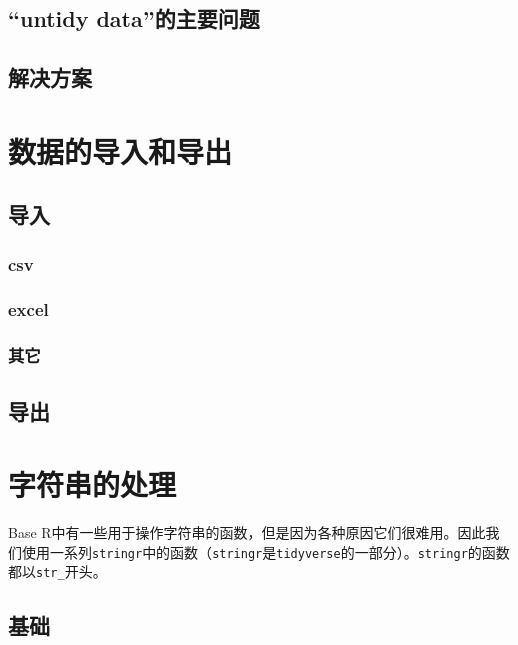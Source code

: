 \documentclass[]{book}
\begin{document}
\hypertarget{untidy-data}{%
\subsection{``untidy data''的主要问题}\label{untidy-data}}

\subsection{解决方案}

\hypertarget{import-export}{%
\section{数据的导入和导出}\label{import-export}}

\hypertarget{data-import}{%
\subsection{导入}\label{data-import}}

\hypertarget{csv}{%
\subsubsection{csv}\label{csv}}

\hypertarget{excel}{%
\subsubsection{excel}\label{excel}}

\subsubsection{其它}

\subsection{导出}

\hypertarget{strings}{%
\section{字符串的处理}\label{strings}}

Base R中有一些用于操作字符串的函数，但是因为各种原因它们很难用。因此我们使用一系列\texttt{stringr}中的函数（\texttt{stringr}是\texttt{tidyverse}的一部分）。\texttt{stringr}的函数都以\texttt{str\_}开头。

\hypertarget{-1}{%
\subsection{基础}\label{-1}}
\end{document}

